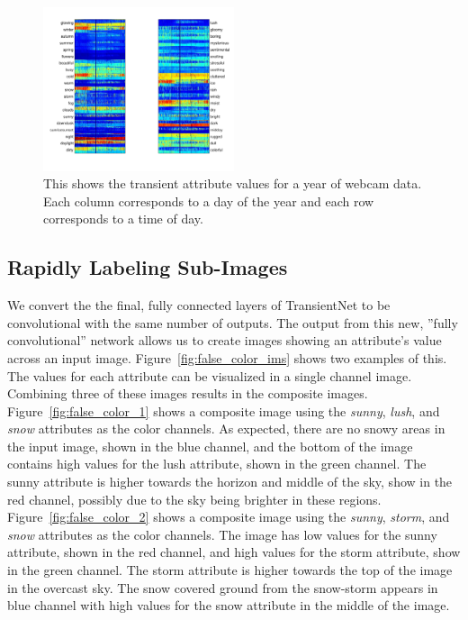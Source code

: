 \documentclass[10pt,twocolumn,letterpaper]{article}
\newcommand{\figref}[1]{Figure~\ref{fig:#1}}
\begin{document}
\begin{figure}[t]
	\centering
		\includegraphics[width=0.5\textwidth, trim= 5mm 15mm 0mm 10mm]{figs/summary_260.pdf}
		\caption{This shows the transient attribute values for a year of webcam 
             data.  Each column corresponds to a day of the year and each row
             corresponds to a time of day.}
		\label{fig:webcam_summary}
\end{figure}


\subsection{Rapidly Labeling Sub-Images}

We convert the the final, fully connected layers of TransientNet to be
convolutional with the same number of outputs.  The output from this new,
''fully convolutional'' network allows us to create images showing an
attribute's value across an input image.  \figref{false_color_ims} shows two
examples of this.  The values for each attribute can be visualized in a single
channel image.  Combining three of these images results in the composite
images.  \figref{false_color_1} shows a composite image using the
\textit{sunny}, \textit{lush}, and \textit{snow} attributes as the color
channels.  As expected, there are no snowy areas in the input image, shown
in the blue channel, and the bottom of the image contains high values for the
lush attribute, shown in the green channel.  The sunny attribute is higher 
towards the horizon and middle of the sky, show in the red channel, possibly 
due to the sky being brighter in these regions.  \figref{false_color_2} shows
a composite image using the \textit{sunny}, \textit{storm}, and \textit{snow}
attributes as the color channels.  The image has low values for the sunny
attribute, shown in the red channel, and high values for the storm attribute,
show in the green channel.  The storm attribute is higher towards the top
of the image in the overcast sky.  The snow covered ground from the 
snow-storm appears in blue channel with high values for the snow attribute in
the middle of the image.
\end{document}
